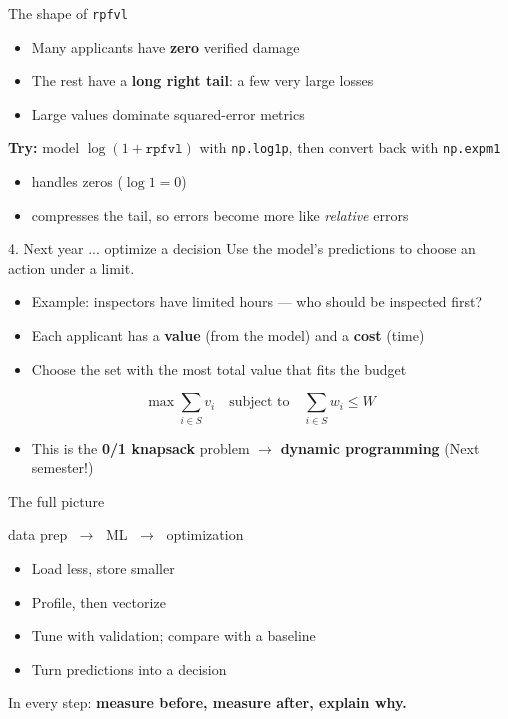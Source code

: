 \documentclass[aspectratio=43,11pt]{beamer}
\begin{document}
\begin{frame}{The shape of \texttt{rpfvl}}
  \begin{itemize}
    \item Many applicants have \textbf{zero} verified damage
    \item The rest have a \textbf{long right tail}: a few very large losses
    \item Large values dominate squared-error metrics
  \end{itemize}
  \vspace{0.8em}
  \textbf{Try:} model $\log(1 + \texttt{rpfvl})$ with \texttt{np.log1p},
  then convert back with \texttt{np.expm1}
  \begin{itemize}
    \item handles zeros ($\log 1 = 0$)
    \item compresses the tail, so errors become more like \emph{relative} errors
  \end{itemize}
\end{frame}

\begin{frame}{4. Next year ... optimize a decision}
  Use the model's predictions to choose an action under a limit.
  \vspace{0.6em}
  \begin{itemize}
    \item Example: inspectors have limited hours --- who should be inspected first?
    \item Each applicant has a \textbf{value} (from the model) and a \textbf{cost} (time)
    \item Choose the set with the most total value that fits the budget
  \end{itemize}
  \[
    \max \sum_{i \in S} v_i \quad \text{subject to} \quad \sum_{i \in S} w_i \le W
  \]
  \begin{itemize}
    \item This is the \textbf{0/1 knapsack} problem $\rightarrow$
          \textbf{dynamic programming} (Next semester!)
  \end{itemize}
\end{frame}

\begin{frame}{The full picture}
  \begin{center}
  \large
  data prep $\;\rightarrow\;$ ML $\;\rightarrow\;$ optimization
  \end{center}
  \vspace{1em}
  \begin{itemize}
    \item Load less, store smaller
    \item Profile, then vectorize
    \item Tune with validation; compare with a baseline
    \item Turn predictions into a decision
  \end{itemize}
  \vspace{1em}
  In every step: \textbf{measure before, measure after, explain why.}
\end{frame}
\end{document}

